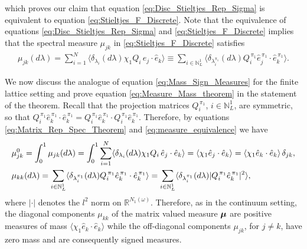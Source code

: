 \documentclass{cmslatex}
\newcommand\bmu{\mbox{\boldmath${\mu}$}}
\begin{document}
%
which proves our
claim that equation \eqref{eq:Disc_Stieltjes_Rep_Sigma} is 
equivalent to equation \eqref{eq:Stieltjes_F_Discrete}. Note
that the equivalence of equations \eqref{eq:Disc_Stieltjes_Rep_Sigma}
and \eqref{eq:Stieltjes_F_Discrete} implies that the spectral 
measure $\mu_{jk}$ in \eqref{eq:Stieltjes_F_Discrete} satisfies 
%
\begin{align}\label{eq:measure_equivalence} 
  \mu_{jk}(d\lambda)=\sum_{i=1}^N \langle\delta_{\lambda_i}(d\lambda)\chi_1Q_i\,\hat{e}_j\cdot\hat{e}_k\rangle
         \equiv\sum_{i\in\mathbb{N}_L^1}
          \langle\delta_{\lambda_i^{\pi_1}}(d\lambda)Q_i^{\,\pi_1}\hat{e}_j^{\,\pi_1}\cdot\hat{e}_k^{\,\pi_1}\rangle.
\end{align}
%

We now discuss the analogue of equation \eqref{eq:Mass_Sign_Measures}
for the finite lattice setting and prove equation
\eqref{eq:Measure_Mass_theorem} in the statement of the
theorem. Recall that the projection matrices $Q_i^{\,\pi_1}$,
$i\in\mathbb{N}_L^1$, are symmetric, so that
$Q_i^{\,\pi_1}\hat{e}_k^{\,\pi_1}\cdot\hat{e}_k^{\,\pi_1}
=Q_i^{\,\pi_1}\hat{e}_k^{\,\pi_1}\cdot Q_i^{\,\pi_1}\hat{e}_k^{\,\pi_1}$. Therefore,
by equations \eqref{eq:Matrix_Rep_Spec_Theorem} and
\eqref{eq:measure_equivalence} we have   
%
\begin{align}\label{eq:Measure_Mass_Lattice}
  &\mu^0_{jk}=\int_0^1\mu_{jk}(d\lambda)
       =\int_0^1\sum_{i=1}^N \langle\delta_{\lambda_i}(d\lambda)\chi_1Q_i\,\hat{e}_j\cdot\hat{e}_k\rangle
       =\langle\chi_1\hat{e}_j\cdot\hat{e}_k\rangle
       =\langle\chi_1\hat{e}_k\cdot\hat{e}_k\rangle\,\delta_{jk}, \notag\\
 &\mu_{kk}(d\lambda)=\sum_{i\in\mathbb{N}_L^1}
             \langle\delta_{\lambda_i^{\pi_1}}(d\lambda)Q_i^{\,\pi_1}\hat{e}_k^{\,\pi_1}\cdot\hat{e}_k^{\,\pi_1}\rangle
         =\sum_{i\in\mathbb{N}_L^1}
             \langle\delta_{\lambda_i^{\pi_1}}(d\lambda)|Q_i^{\,\pi_1}\hat{e}_k^{\,\pi_1}|^2\rangle,            
\end{align}
%
where $|\cdot|$ denotes the $l^2$ norm on $\mathbb{R}^{N_1(\omega)}$.
Therefore, as in the continuum setting, the diagonal components
$\mu_{kk}$ of the matrix valued measure $\bmu$ are positive measures of
mass $\langle\chi_1\hat{e}_k\cdot\hat{e}_k\rangle$ while the off-diagonal components
$\mu_{jk}$, for $j\neq k$, have zero mass and are consequently signed
measures.
\end{document}
